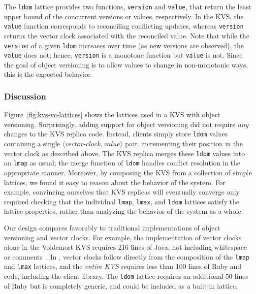The \texttt{ldom} lattice provides two functions, \texttt{version} and
\texttt{value}, that return the least upper bound of the concurrent versions or
values, respectively. In the KVS, the \texttt{value} function corresponds to
reconciling conflicting updates, whereas \texttt{version} returns the vector
clock associated with the reconciled value. Note that while the \texttt{version}
of a given \texttt{ldom} increases over time (as new versions are observed), the
\texttt{value} does not; hence, \texttt{version} is a monotone function but
\texttt{value} is not. Since the goal of object versioning is to allow values to
change in non-monotonic ways, this is the expected behavior.

\subsubsection{Discussion}
Figure~\ref{fig:kvs-vc-lattices} shows the lattices used in a KVS with object
versioning. Surprisingly, adding support for object versioning did not require
\emph{any} changes to the KVS replica code. Instead, clients simply store
\texttt{ldom} values containing a single
$\langle\textit{vector-clock},\textit{value}\rangle$ pair, incrementing their
position in the vector clock as described above. The KVS replica merges these
\texttt{ldom} values into an \texttt{lmap} as usual; the merge function of
\texttt{ldom} handles conflict resolution in the appropriate manner. Moreover,
by composing the KVS from a collection of simple lattices, we found it easy to
reason about the behavior of the system. For example, convincing ourselves that
KVS replicas will eventually converge only required checking that the individual
\texttt{lmap}, \texttt{lmax}, and \texttt{ldom} lattices satisfy the lattice
properties, rather than analyzing the behavior of the system as a whole.

Our design compares favorably to traditional implementations of object
versioning and vector clocks. For example, the implementation of vector clocks
alone in the Voldemort KVS requires 216 lines of Java, not including whitespace
or comments~\cite{voldemort-vector-clock}. In \lang, vector clocks follow
directly from the composition of the \texttt{lmap} and \texttt{lmax} lattices,
and the \emph{entire KVS} requires less than 100 lines of Ruby and \lang code,
including the client library. The \texttt{ldom} lattice requires an additional
50 lines of Ruby but is completely generic, and could be included as a built-in
lattice.


